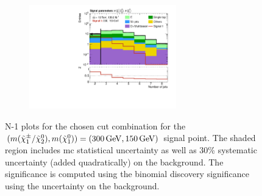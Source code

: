 \begin{figure}
\begin{subfigure}[b]{0.5\linewidth}
		\caption{}
	\end{subfigure}\hfill
	\begin{subfigure}[b]{0.5\linewidth}
		\centering\includegraphics[width=0.7\textwidth]{N-1_cut_scan/n1_300_150/nJet30}
		\caption{}
	\end{subfigure}

	\caption[N-1 plots for the chosen cut combination for the (300, 150) signal point]{N-1 plots for the chosen cut combination for the $(m(\charg/\neutr), m(\lsp)) = (\SI{300}{\GeV}, \SI{150}{\GeV})$ signal point. The shaded region includes \gls{mc} statistical uncertainty as well as 30\% systematic uncertainty (added quadratically) on the background. The significance is computed using the binomial discovery significance using the uncertainty on the background.}
	\label{fig:results_n1_300_150}
\end{figure}



